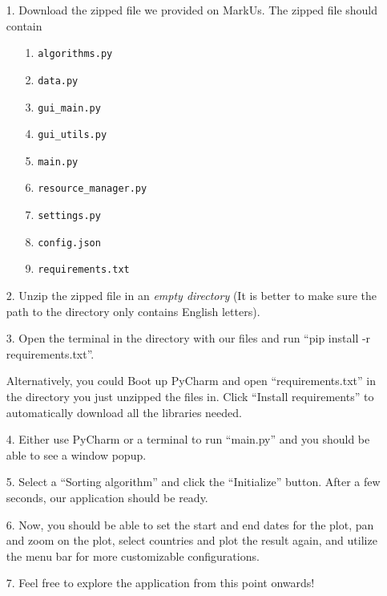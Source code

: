 \documentclass[fontsize=11pt]{article}
\begin{document}
    \begin{enumerate}
        \item [1.]
            Download the zipped file we provided on MarkUs. The zipped file should contain 
            \begin{enumerate}
                \item [1.] \verb|algorithms.py|
                \item [2.] \verb|data.py|
                \item [3.] \verb|gui_main.py|
                \item [4.] \verb|gui_utils.py|
                \item [5.] \verb|main.py|
                \item [6.] \verb|resource_manager.py|
                \item [7.] \verb|settings.py|
                \item [8.] \verb|config.json|
                \item [9.] \verb|requirements.txt|
            \end{enumerate}

        \item [2.]
            Unzip the zipped file in an \emph{empty directory} (It is better to make sure the path to the directory only contains English letters).
        \item [3.]
            Open the terminal in the directory with our files and run ``pip install -r requirements.txt''.

            Alternatively, you could Boot up PyCharm and open ``requirements.txt'' in the directory you just unzipped the files in. Click ``Install requirements'' to automatically download all the libraries needed.

        \item [4.]
            Either use PyCharm or a terminal to run ``main.py'' and you should be able to see a window popup.

        \item [5.]
            Select a ``Sorting algorithm'' and click the ``Initialize'' button. After a few seconds, our application should be ready.

        \item [6.]
            Now, you should be able to set the start and end dates for the plot, pan and zoom on the plot, select countries and plot the result again, and utilize the menu bar for more customizable configurations.

        \item [7.]
            Feel free to explore the application from this point onwards!

    \end{enumerate}
\end{document}
